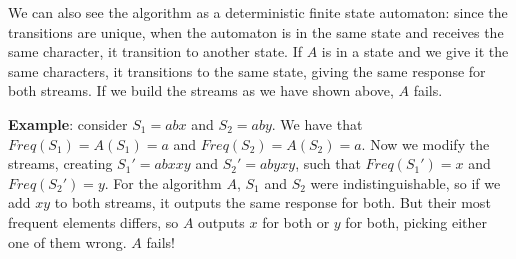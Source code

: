 \documentclass{article}
\begin{document}
We can also see the algorithm as a deterministic finite state automaton: since the transitions are unique, when the automaton is in the same state and receives the same character, it transition to another state. If $A$ is in a state and we give it the same characters, it transitions to the same state, giving the same response for both streams. If we build the streams as we have shown above, $A$ fails. 

\textbf{Example}: consider $S_1=abx$ and $S_2=aby$. We have that $Freq(S_1)=A(S_1)=a$ and $Freq(S_2)=A(S_2)=a$. Now we modify the streams, creating $S_1'=abxxy$ and $S_2'=abyxy$, such that $Freq(S_1')=x$ and $Freq(S_2')=y$. For the algorithm $A$, $S_1$ and $S_2$ were indistinguishable, so if we add $xy$ to both streams, it outputs the same response for both. But their most frequent elements differs, so $A$ outputs $x$ for both or $y$ for both, picking either one of them wrong. $A$ fails!
\end{document}
